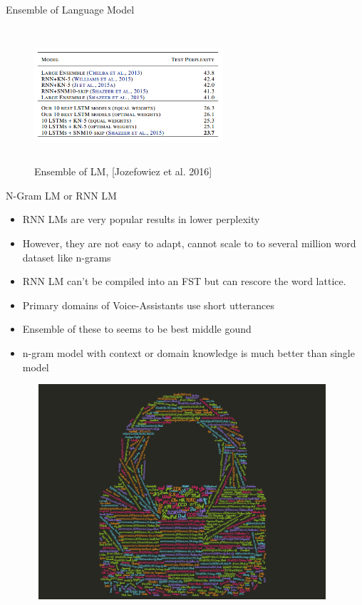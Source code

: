 \documentclass{beamer}
\begin{document}
\begin{frame}{Ensemble of Language Model}
	\begin{figure}
	   \includegraphics[width=7cm, height=5cm]{figs/results_exploring_lm2.png}
	   \caption{Ensemble of LM, [Jozefowiez et al. 2016]}
	\end{figure}
\end{frame}


\begin{frame}{N-Gram LM or RNN LM}
	\begin{itemize}
		\item RNN LMs are very popular results in lower perplexity
		\item However, they are not easy to adapt, cannot scale to to several million word dataset like n-grams
		\item RNN LM can't be compiled into an FST but can rescore the word lattice.
		\item Primary domains of Voice-Assistants use short utterances
		\item Ensemble of these to seems to be best middle gound
		\item n-gram model with context or domain knowledge is much better than single model
	\end{itemize}
\end{frame}


\begin{frame}
	\begin{figure}
	   \includegraphics[width=11cm, height=8cm]{figs/word_cloud_gis_2.png}
	\end{figure}
\end{frame}
\end{document}
